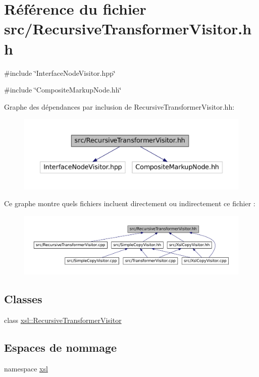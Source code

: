 \hypertarget{_recursive_transformer_visitor_8hh}{
\section{Référence du fichier src/RecursiveTransformerVisitor.hh}
\label{_recursive_transformer_visitor_8hh}
}
{\ttfamily \#include \char`\"{}InterfaceNodeVisitor.hpp\char`\"{}}\par
{\ttfamily \#include \char`\"{}CompositeMarkupNode.hh\char`\"{}}\par
Graphe des dépendances par inclusion de RecursiveTransformerVisitor.hh:\nopagebreak
\begin{figure}[H]
\begin{center}
\leavevmode
\includegraphics[width=400pt]{_recursive_transformer_visitor_8hh__incl}
\end{center}
\end{figure}
Ce graphe montre quels fichiers incluent directement ou indirectement ce fichier :
\nopagebreak
\begin{figure}[H]
\begin{center}
\leavevmode
\includegraphics[width=400pt]{_recursive_transformer_visitor_8hh__dep__incl}
\end{center}
\end{figure}
\subsection*{Classes}
\begin{DoxyCompactItemize}
\item 
class \hyperlink{classxsl_1_1_recursive_transformer_visitor}{xsl::RecursiveTransformerVisitor}
\end{DoxyCompactItemize}
\subsection*{Espaces de nommage}
\begin{DoxyCompactItemize}
\item 
namespace \hyperlink{namespacexsl}{xsl}
\end{DoxyCompactItemize}

